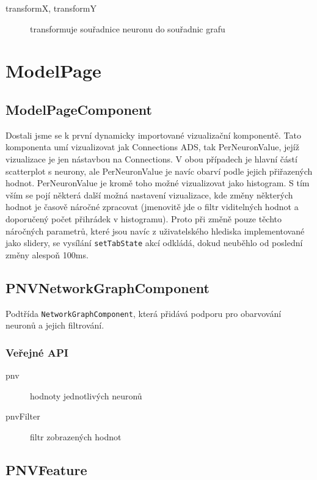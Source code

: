 \begin{description}
  \item[transformX, transformY] transformuje souřadnice neuronu do souřadnic grafu
\end{description}

\section{ModelPage}

\subsection{ModelPageComponent}

Dostali jsme se k první dynamicky importované vizualizační komponentě. Tato komponenta umí vizualizovat jak Connections ADS, tak PerNeuronValue, jejíž vizualizace je jen nástavbou na Connections. V obou případech je hlavní částí scatterplot s neurony, ale PerNeuronValue je navíc obarví podle jejich přiřazených hodnot. PerNeuronValue je kromě toho možné vizualizovat jako histogram. S tím vším se pojí některá další možná nastavení vizualizace, kde změny některých hodnot je časově náročné zpracovat (jmenovitě jde o filtr viditelných hodnot a doporučený počet přihrádek v histogramu). Proto při změně pouze těchto náročných parametrů, které jsou navíc z uživatelského hlediska implementované jako slidery, se vysílání \lstinline|setTabState| akcí odkládá, dokud neuběhlo od poslední změny alespoň 100ms.

\subsection{PNVNetworkGraphComponent}

Podtřída \lstinline|NetworkGraphComponent|, která přidává podporu pro obarvování neuronů a jejich filtrování.

\subsubsection*{Veřejné API}

\begin{description}
  \item[pnv] hodnoty jednotlivých neuronů
  \item[pnvFilter] filtr zobrazených hodnot
\end{description}

\subsection{PNVFeature}

